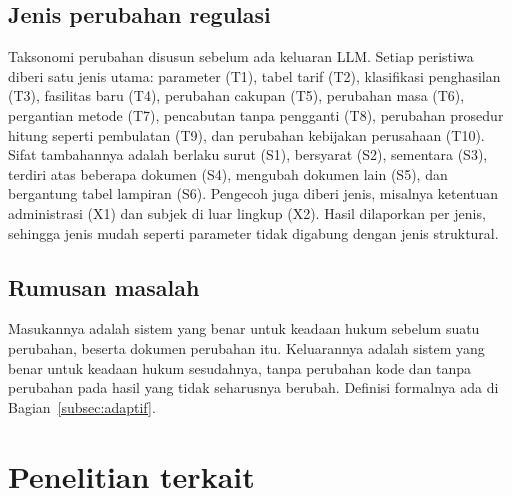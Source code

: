 \documentclass[conference]{IEEEtran}
\begin{document}
\subsection{Jenis perubahan regulasi}
\label{subsec:jenis-perubahan}
Taksonomi perubahan disusun sebelum ada keluaran LLM. Setiap peristiwa diberi satu jenis utama: parameter (T1), tabel tarif (T2), klasifikasi penghasilan (T3), fasilitas baru (T4), perubahan cakupan (T5), perubahan masa (T6), pergantian metode (T7), pencabutan tanpa pengganti (T8), perubahan prosedur hitung seperti pembulatan (T9), dan perubahan kebijakan perusahaan (T10). Sifat tambahannya adalah berlaku surut (S1), bersyarat (S2), sementara (S3), terdiri atas beberapa dokumen (S4), mengubah dokumen lain (S5), dan bergantung tabel lampiran (S6). Pengecoh juga diberi jenis, misalnya ketentuan administrasi (X1) dan subjek di luar lingkup (X2). Hasil dilaporkan per jenis, sehingga jenis mudah seperti parameter tidak digabung dengan jenis struktural.

\subsection{Rumusan masalah}
Masukannya adalah sistem yang benar untuk keadaan hukum sebelum suatu perubahan, beserta dokumen perubahan itu. Keluarannya adalah sistem yang benar untuk keadaan hukum sesudahnya, tanpa perubahan kode dan tanpa perubahan pada hasil yang tidak seharusnya berubah. Definisi formalnya ada di Bagian~\ref{subsec:adaptif}.

\section{Penelitian terkait}
\label{sec:terkait}
\end{document}
